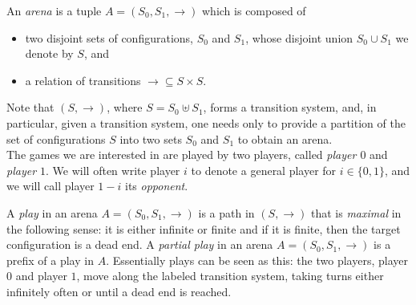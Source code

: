 \documentclass[a4paper,UKenglish,cleveref, autoref, thm-restate]{lipics-v2021}
\newcommand\mh[1]{\todo[inline,size=\scriptsize]{#1 - \textbf{Mathieu}}}
\begin{document}
\begin{samepage}
An {\em arena} is a tuple $A=(S_0, S_1,{\rightarrow})$  which is composed of
\begin{itemize}
	\item two  disjoint  sets of configurations, $S_0$ and $S_1$, %
	whose disjoint union $S_0 \cup S_1$ we denote by $S$, and
	\item a relation of %
		transitions
	 ${\rightarrow} \subseteq S \times %
	 				S$. 
\end{itemize}
\end{samepage}

\noindent
Note that $(S,{\rightarrow})$, where $S=S_0 \uplus S_1$, forms
a %
transition system, and, in particular, given a 
transition system,
one needs only to provide 
a partition of the set of configurations $S$ into two sets $S_0$ and $S_1$ to obtain an arena. \\



\noindent
The games we are interested in are played by two players, called {\em player $0$} and {\em player $1$}. We will often write player $i$ to denote a general player for $i \in \{0,1 \}$,
and we will call player $1-i$ its {\em opponent}. 

\noindent
A {\em play} in an arena $A=(S_0,S_1,\rightarrow)$ is a path in $(S,{\rightarrow})$ that is {\em maximal} in the following sense: it is either infinite or finite and if it is finite, then the target configuration is a dead end. 
A {\em partial play} in an arena $A=(S_0,S_1,\rightarrow)$ is a 
prefix of a play in $A$.
Essentially plays can be seen as this: the two players, player $0$ and player $1$, move along the labeled transition system, taking turns either inﬁnitely often or until a dead end is reached.
\end{document}
